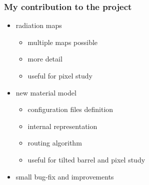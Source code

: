 \documentclass[pdftex, 11pt]{beamer}
\begin{document}

\begin{frame}
  \frametitle{My contribution to the project}
  \begin{itemize}
  \item \alert{radiation maps}
    \pause
    \begin{itemize}
    \item \alert{multiple} maps possible
    \item more \alert{detail}
      \pause
    \item useful for \alert{pixel} study
    \end{itemize}
    \pause
  \item new \alert{material} model
    \pause
    \begin{itemize}
    \item configuration \alert{files} definition
    \item internal \alert{representation}
    \item routing \alert{algorithm}
      \pause
    \item useful for \alert{tilted} barrel and \alert{pixel} study
    \end{itemize}
    \pause
  \item small \alert{bug-fix} and improvements
  \end{itemize}
\end{frame}
\end{document}
